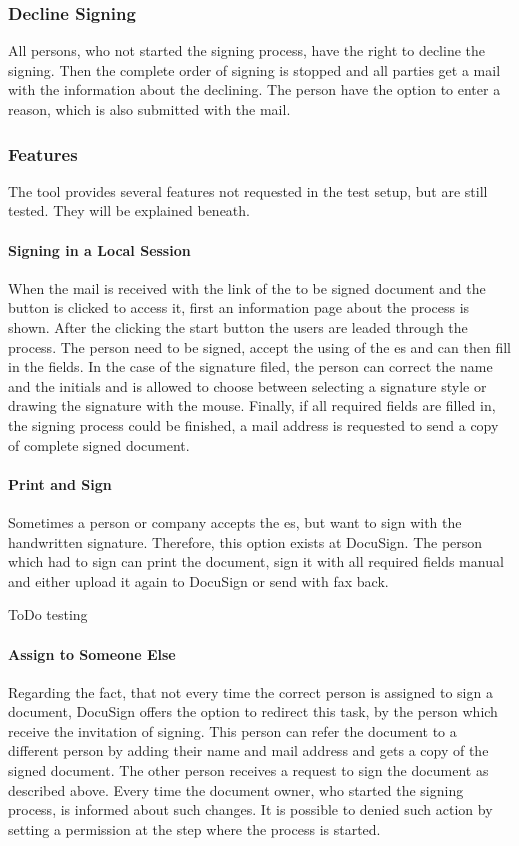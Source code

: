 \subsubsection{Decline Signing}
All persons, who not started the signing process, have the right to decline the signing. Then the complete order of signing is stopped and all parties get a mail with the information about the declining. The person have the option to enter a reason, which is also submitted with the mail.

\subsubsection{Features}
The tool provides several features not requested in the test setup, but are still tested. They will be explained beneath.
\paragraph{Signing in a Local Session}
When the mail is received with the link of the to be signed document and the button is clicked to access it, first an information page about the process is shown. After the clicking the start button the users are leaded through the process. The person need to be signed, accept the using of the \gls{es} and can then fill in the fields. In the case of the signature filed, the person can correct the name and the initials and is allowed to choose between selecting a signature style or drawing the signature with the mouse. Finally, if all required fields are filled in, the signing process could be finished, a mail address is requested to send a copy of complete signed document. 

\paragraph{Print and Sign}
Sometimes a person or company accepts the \gls{es}, but want to sign with the handwritten signature. Therefore, this option exists at DocuSign. The person which had to sign can print the document, sign it with all required fields manual and either upload it again to DocuSign or send with fax back.

ToDo testing 

\paragraph{Assign to Someone Else}
Regarding the fact, that not every time the correct person is assigned to sign a document, DocuSign offers the option to redirect this task, by the person which receive the invitation of signing. This person can refer the document to a different person by adding their name and mail address and gets a copy of the signed document. The other person receives a request to sign the document as described above. Every time the document owner, who started the signing process, is informed about such changes.
It is possible to denied such action by setting a permission at the step where the process is started. 

